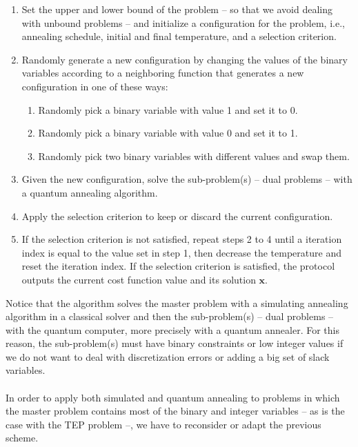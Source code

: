 \begin{enumerate}
    \item Set the upper and lower bound of the problem -- so that we avoid dealing with unbound problems -- and initialize a configuration for the problem, i.e., annealing schedule, initial and final temperature, and a selection criterion.
    \item Randomly generate a new configuration by changing the values of the binary variables according to a neighboring function that generates a new configuration in one of these ways:
    \begin{enumerate}
        \item Randomly pick a binary variable with value 1 and set it to 0.
        \item Randomly pick a binary variable with value 0 and set it to 1.
        \item Randomly pick two binary variables with different values and swap them.
    \end{enumerate}
    \item Given the new configuration, solve the sub-problem(s) -- dual problems -- with a quantum annealing algorithm.
    \item Apply the selection criterion to keep or discard the current configuration.
    \item If the selection criterion is not satisfied, repeat steps 2 to 4 until a iteration index is equal to the value set in step 1, then decrease the temperature and reset the iteration index. If the selection criterion is satisfied, the protocol outputs the current cost function value and its solution $\mathbf{x}$.
\end{enumerate}
Notice that the algorithm solves the master problem with a simulating annealing algorithm in a classical solver and then the sub-problem(s) -- dual problems -- with the quantum computer, more precisely with a quantum annealer. For this reason, the sub-problem(s) must have binary constraints or low integer values if we do not want to deal with discretization errors or adding a big set of slack variables.\\\\
In order to apply both simulated and quantum annealing to problems in which the master problem contains most of the binary and integer variables -- as is the case with the TEP problem --, we have to reconsider or adapt the previous scheme.
